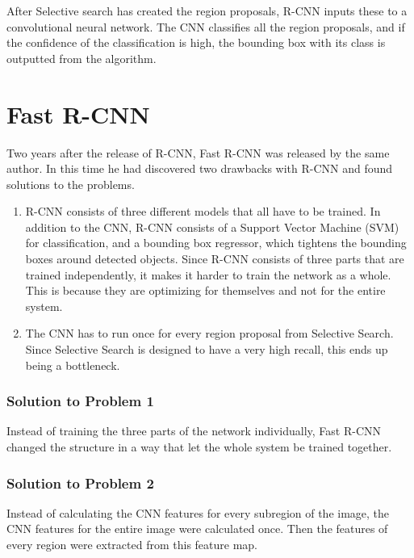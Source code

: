 \newpage

After Selective search has created the region proposals, R-CNN inputs these to a convolutional neural network. The CNN classifies all the region proposals, and if the confidence of the classification is high, the bounding box with its class is outputted from the algorithm. 


\section{Fast R-CNN}

Two years after the release of R-CNN, Fast R-CNN  \citep{FastR-CNN} was released by the same author. In this time he had discovered two drawbacks with R-CNN and found solutions to the problems. 

\begin{enumerate}
    \item R-CNN consists of three different models that all have to be trained. In addition to the CNN, R-CNN consists of a Support Vector Machine (SVM) for classification, and a bounding box regressor, which tightens the bounding boxes around detected objects. Since R-CNN consists of three parts that are trained independently, it makes it harder to train the network as a whole. This is because they are optimizing for themselves and not for the entire system. 
    \item The CNN has to run once for every region proposal from Selective Search. Since Selective Search is designed to have a very high recall, this ends up being a bottleneck. 
\end{enumerate}

\subsubsection{Solution to Problem 1}
Instead of training the three parts of the network individually, Fast R-CNN changed the structure in a way that let the whole system be trained together.

\subsubsection{Solution to Problem 2}
Instead of calculating the CNN features for every subregion of the image, the CNN features for the entire image were calculated once. Then the features of every region were extracted from this feature map.



